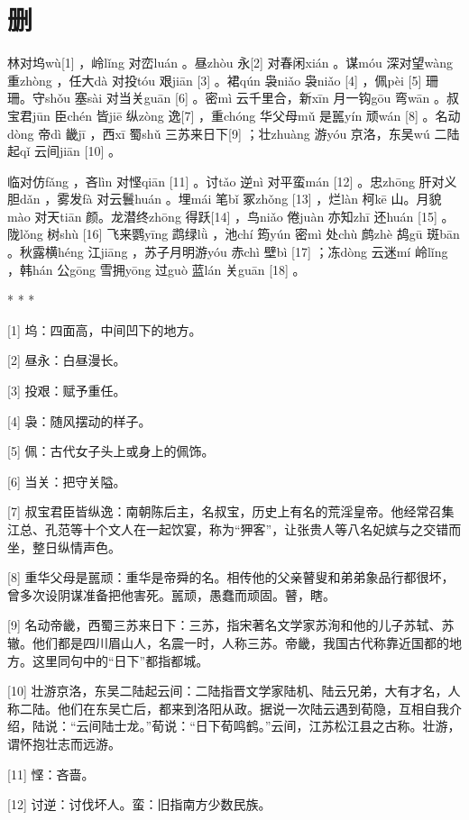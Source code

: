 \documentclass[12pt,UTF8]{ctexbook}
\begin{document}
\chapter{删}


林对坞wù[1] ，岭lǐng 对峦luán 。昼zhòu 永[2] 对春闲xián 。谋móu 深对望wàng 重zhòng ，任大dà 对投tóu 艰jiān [3] 。裙qún 袅niǎo 袅niǎo [4] ，佩pèi [5] 珊珊。守shǒu 塞sài 对当关guān [6] 。密mì 云千里合，新xīn 月一钩gōu 弯wān 。叔宝君jūn 臣chén 皆jiē 纵zòng 逸[7] ，重chóng 华父母mǔ 是嚚yín 顽wán [8] 。名动dòng 帝dì 畿jī ，西xī 蜀shǔ 三苏来日下[9] ；壮zhuàng 游yóu 京洛，东吴wú 二陆起qǐ 云间jiān [10] 。

临对仿fǎng ，吝lìn 对悭qiān [11] 。讨tǎo 逆nì 对平蛮mán [12] 。忠zhōng 肝对义胆dǎn ，雾发fà 对云鬟huán 。埋mái 笔bǐ 冢zhǒng [13] ，烂làn 柯kē 山。月貌mào 对天tiān 颜。龙潜终zhōng 得跃[14] ，鸟niǎo 倦juàn 亦知zhī 还huán [15] 。陇lǒng 树shù [16] 飞来鹦yīng 鹉绿lǜ ，池chí 筠yún 密mì 处chù 鹧zhè 鸪gū 斑bān 。秋露横héng 江jiāng ，苏子月明游yóu 赤chì 壁bì [17] ；冻dòng 云迷mí 岭lǐng ，韩hán 公gōng 雪拥yōng 过guò 蓝lán 关guān [18] 。



* * *



[1] 坞：四面高，中间凹下的地方。

[2] 昼永：白昼漫长。

[3] 投艰：赋予重任。

[4] 袅：随风摆动的样子。

[5] 佩：古代女子头上或身上的佩饰。

[6] 当关：把守关隘。

[7] 叔宝君臣皆纵逸：南朝陈后主，名叔宝，历史上有名的荒淫皇帝。他经常召集江总、孔范等十个文人在一起饮宴，称为“狎客”，让张贵人等八名妃嫔与之交错而坐，整日纵情声色。

[8] 重华父母是嚚顽：重华是帝舜的名。相传他的父亲瞽叟和弟弟象品行都很坏，曾多次设阴谋准备把他害死。嚚顽，愚蠢而顽固。瞽，瞎。

[9] 名动帝畿，西蜀三苏来日下：三苏，指宋著名文学家苏洵和他的儿子苏轼、苏辙。他们都是四川眉山人，名震一时，人称三苏。帝畿，我国古代称靠近国都的地方。这里同句中的“日下”都指都城。

[10] 壮游京洛，东吴二陆起云间：二陆指晋文学家陆机、陆云兄弟，大有才名，人称二陆。他们在东吴亡后，都来到洛阳从政。据说一次陆云遇到荀隐，互相自我介绍，陆说：“云间陆士龙。”荀说：“日下荀鸣鹤。”云间，江苏松江县之古称。壮游，谓怀抱壮志而远游。

[11] 悭：吝啬。

[12] 讨逆：讨伐坏人。蛮：旧指南方少数民族。
\end{document}
